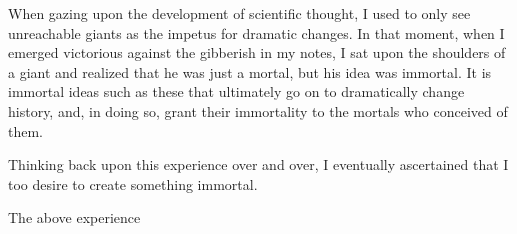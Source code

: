\documentclass[12pt]{article}
\begin{document}
When gazing upon the development of scientific thought, I used to only see unreachable giants as the impetus for dramatic changes. In that moment, when I emerged victorious against the gibberish in my notes, I sat upon the shoulders of a giant and realized that he was just a mortal, but his idea was immortal. It is immortal ideas such as these that ultimately go on to dramatically change history, and, in doing so, grant their immortality to the mortals who conceived of them.

Thinking back upon this experience over and over, I eventually ascertained that I too desire to create something immortal.

The above experience



\end{document}

